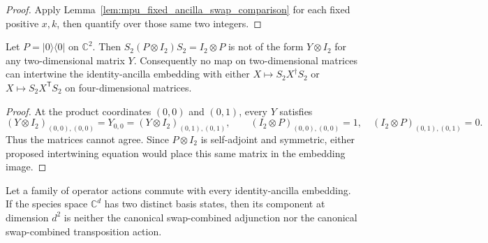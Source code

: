 \begin{proof}\leanok
    Apply Lemma~\ref{lem:mpu_fixed_ancilla_swap_comparison} for each fixed
    positive $x,k$, then quantify over those same two integers.
\end{proof}

\begin{lemma}
    \label{lem:mpu_swap_ancilla_image_obstruction}
    \leanok
    Let $P=\lvert0\rangle\langle0\rvert$ on $\mathbb C^2$. Then
    $S_2(P\otimes I_2)S_2=I_2\otimes P$ is not of the form
    $Y\otimes I_2$ for any two-dimensional matrix $Y$. Consequently no
    map on two-dimensional matrices can intertwine the identity-ancilla
    embedding with either $X\mapsto S_2X^\dagger S_2$ or
    $X\mapsto S_2X^{\mathsf T}S_2$ on four-dimensional matrices.
\end{lemma}

\begin{proof}\leanok
    At the product coordinates $(0,0)$ and $(0,1)$, every $Y$ satisfies
    \[
        (Y\otimes I_2)_{(0,0),(0,0)}=Y_{0,0}
        =(Y\otimes I_2)_{(0,1),(0,1)},
        \qquad
        (I_2\otimes P)_{(0,0),(0,0)}=1,
        \quad
        (I_2\otimes P)_{(0,1),(0,1)}=0.
    \]
    Thus the matrices cannot agree. Since $P\otimes I_2$ is
    self-adjoint and symmetric, either proposed intertwining equation
    would place this same matrix in the embedding image.
\end{proof}

\begin{lemma}
    \label{lem:mpu_swap_coherent_family_obstruction}
    \leanok
    Let a family of operator actions commute with every identity-ancilla
    embedding. If the species space $\mathbb C^d$ has two distinct basis
    states, then its component at dimension $d^2$ is neither the
    canonical swap-combined adjunction nor the canonical swap-combined
    transposition action.
\end{lemma}

